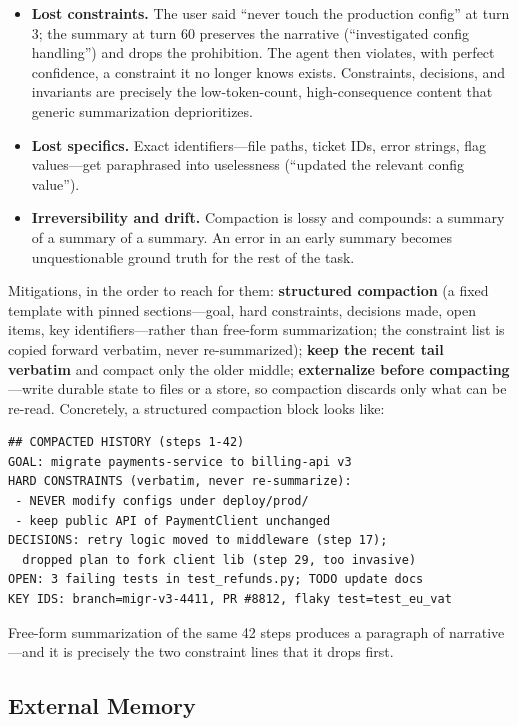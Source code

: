 \begin{itemize}
    \item \textbf{Lost constraints.} The user said ``never touch the production config'' at turn 3; the summary at turn 60 preserves the narrative (``investigated config handling'') and drops the prohibition. The agent then violates, with perfect confidence, a constraint it no longer knows exists. Constraints, decisions, and invariants are precisely the low-token-count, high-consequence content that generic summarization deprioritizes.
    \item \textbf{Lost specifics.} Exact identifiers---file paths, ticket IDs, error strings, flag values---get paraphrased into uselessness (``updated the relevant config value'').
    \item \textbf{Irreversibility and drift.} Compaction is lossy and compounds: a summary of a summary of a summary. An error in an early summary becomes unquestionable ground truth for the rest of the task.
\end{itemize}

Mitigations, in the order to reach for them: \textbf{structured compaction} (a fixed template with pinned sections---goal, hard constraints, decisions made, open items, key identifiers---rather than free-form summarization; the constraint list is copied forward verbatim, never re-summarized); \textbf{keep the recent tail verbatim} and compact only the older middle; \textbf{externalize before compacting}---write durable state to files or a store, so compaction discards only what can be re-read. Concretely, a structured compaction block looks like:

\begin{lstlisting}
## COMPACTED HISTORY (steps 1-42)
GOAL: migrate payments-service to billing-api v3
HARD CONSTRAINTS (verbatim, never re-summarize):
 - NEVER modify configs under deploy/prod/
 - keep public API of PaymentClient unchanged
DECISIONS: retry logic moved to middleware (step 17);
  dropped plan to fork client lib (step 29, too invasive)
OPEN: 3 failing tests in test_refunds.py; TODO update docs
KEY IDS: branch=migr-v3-4411, PR #8812, flaky test=test_eu_vat
\end{lstlisting}

Free-form summarization of the same 42 steps produces a paragraph of narrative---and it is precisely the two constraint lines that it drops first.

\subsection{External Memory}

